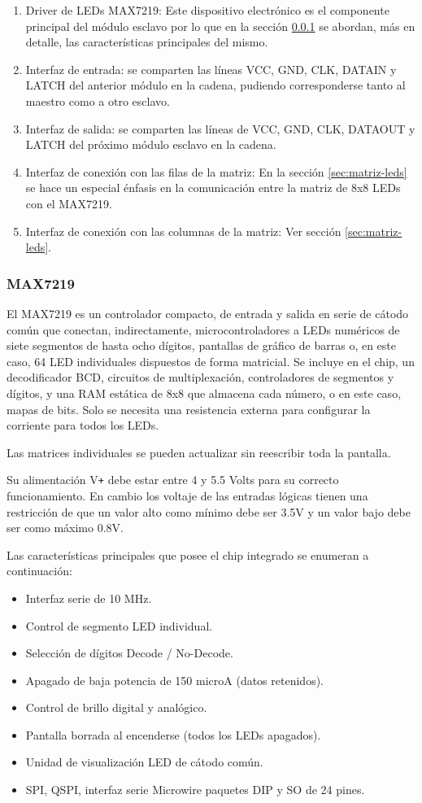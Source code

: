 \begin{enumerate}
	\item Driver de LEDs MAX7219: Este dispositivo electrónico es el componente principal del módulo esclavo por lo que en la sección \ref{sec:max7219} se abordan, más en detalle, las características principales del mismo.
	\item Interfaz de entrada: se comparten las líneas VCC, GND, CLK, DATAIN y LATCH del anterior módulo en la cadena, pudiendo corresponderse tanto al maestro como a otro esclavo.
	\item Interfaz de salida: se comparten las líneas de VCC, GND, CLK, DATAOUT y LATCH del próximo módulo esclavo en la cadena.
	\item Interfaz de conexión con las filas de la matriz: En la sección \ref{sec:matriz-leds} se hace un especial énfasis en la comunicación entre la matriz de 8x8 LEDs con el MAX7219.
	\item Interfaz de conexión con las columnas de la matriz: Ver sección \ref{sec:matriz-leds}.
\end{enumerate}

\subsubsection{MAX7219}\label{sec:max7219}
El MAX7219 es un controlador compacto, de entrada y salida en serie de cátodo común que conectan, indirectamente, microcontroladores a LEDs numéricos de siete segmentos de hasta ocho dígitos, pantallas de gráfico de barras o, en este caso, 64 LED individuales dispuestos de forma matricial. Se incluye en el chip, un decodificador BCD, circuitos de multiplexación, controladores de segmentos y dígitos, y una RAM estática de 8x8 que almacena cada número, o en este caso, mapas de bits. Solo se necesita una resistencia externa para configurar la corriente para todos los LEDs.

Las matrices individuales se pueden actualizar sin reescribir toda la pantalla.

Su alimentación V\texttt{+} debe estar entre 4 y 5.5 Volts para su correcto funcionamiento. En cambio los voltaje de las entradas lógicas tienen una restricción de que un valor alto como mínimo debe ser 3.5V y un valor bajo debe ser como máximo 0.8V.

Las características principales que posee el chip integrado se enumeran a continuación:
\begin{itemize}
	\item Interfaz serie de 10 MHz.
	\item Control de segmento LED individual.
	\item Selección de dígitos Decode / No-Decode.
	\item Apagado de baja potencia de 150 microA (datos retenidos).
	\item Control de brillo digital y analógico.
	\item Pantalla borrada al encenderse (todos los LEDs apagados).
	\item Unidad de visualización LED de cátodo común.
	\item SPI, QSPI, interfaz serie Microwire paquetes DIP y SO de 24 pines.
\end{itemize}

